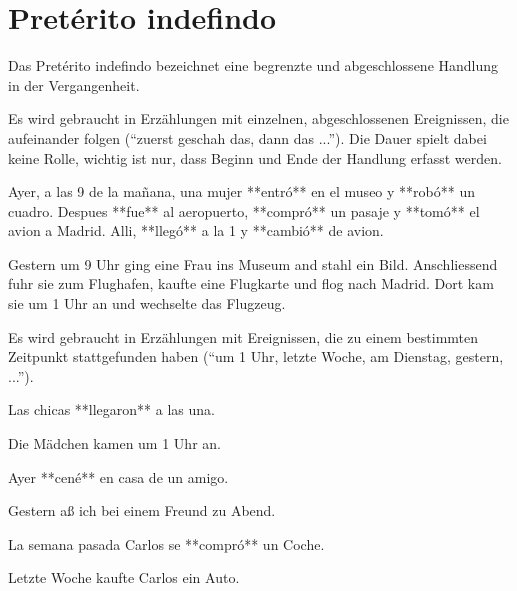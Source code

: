 \section*{Pretérito indefindo}

Das Pretérito indefindo bezeichnet eine begrenzte und abgeschlossene Handlung
in der Vergangenheit.

Es wird gebraucht in Erzählungen mit einzelnen, abgeschlossenen Ereignissen,
die aufeinander folgen ("`zuerst geschah das, dann das ..."').
Die Dauer spielt dabei keine Rolle, wichtig ist nur, dass Beginn und Ende der
Handlung erfasst werden.


\begin{compactitem}
    \item Ayer, a las 9 de la mañana, una mujer **entró** en el museo y **robó** un
          cuadro. Despues **fue** al aeropuerto, **compró** un pasaje y **tomó** el
          avion a Madrid. Alli, **llegó** a la 1 y **cambió** de avion.
    \begin{compactitem}
        \item Gestern um 9 Uhr ging eine Frau ins Museum and stahl ein Bild. Anschliessend
              fuhr sie zum Flughafen, kaufte eine Flugkarte und flog nach Madrid.
              Dort kam sie um 1 Uhr an und wechselte das Flugzeug.
    \end{compactitem}
\end{compactitem}

Es wird gebraucht in Erzählungen mit Ereignissen, die zu einem bestimmten
Zeitpunkt stattgefunden haben ("`um 1 Uhr, letzte Woche, am Dienstag,
gestern, ..."').

\begin{compactitem}
    \item Las chicas **llegaron** a las una.
    \begin{compactitem}\itshape
        \item Die Mädchen kamen um 1 Uhr an.
    \end{compactitem}
    \item Ayer **cené** en casa de un amigo.
    \begin{compactitem}\itshape
        \item  Gestern aß ich bei einem Freund zu Abend.
    \end{compactitem}
    \item La semana pasada Carlos se **compró** un Coche.
    \begin{compactitem}\itshape
        \item Letzte Woche kaufte Carlos ein Auto.
    \end{compactitem}
\end{compactitem}


